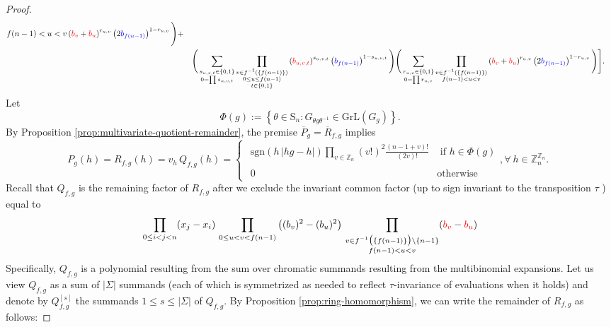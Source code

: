 \begin{proof}
\[\begin{aligned}
{{f(n-1)<u<v
}
}\left({\color{red}b_{v}}+{\color{red}b_{u}}\right)^{r_{u,v}}\left(2{\color{blue}b_{f(n-1)}}\right)^{1-r_{u,v}}\Bigg)+\\
 & \quad\Bigg(\sum_{\substack{s_{u,v,t}\in\{0,1\}\\
0=\prod s_{u,v,t}
}
}\prod_{\substack{v\in f^{-1}(\{f(n-1)\})\\
0\leq u\leq f(n-1)\\
t\in\{0,1\}
}
}\left({\color{red}b_{u,v,t}}\right)^{s_{u,v,t}}\left({\color{blue}b_{f(n-1)}}\right)^{1-s_{u,v,t}}\Bigg)\Bigg(\sum_{\substack{r_{u,v}\in\{0,1\}\\
0=\prod r_{u,v}
}
}\prod_{\substack{v\in f^{-1}(\{f(n-1)\})\\
f(n-1)<u<v
}
}\left({\color{red}b_{v}}+{\color{red}b_{u}}\right)^{r_{u,v}}\left(2{\color{blue}b_{f(n-1)}}\right)^{1-r_{u,v}}\Bigg)\Bigg].
\end{aligned}
\]
Let
\[
\Phi(g):=\left\{ \theta\in\text{S}_{n}:G_{\theta g\theta^{-1}}\in\text{GrL}(G_{g})\right\}.
\]
By Proposition \ref{prop:multivariate-quotient-remainder}, the premise $\overline{P}_{g}=\overline{R}_{f,g}$ implies 
\begin{equation}
P_{g}(h)=R_{f,g}\left(h\right)=v_{h}\,Q_{f,g}\left(h\right)=\begin{cases}
\begin{array}{cc}
\text{sgn}(h\,\left|hg-h\right|)\underset{v\in\mathbb{Z}_{n}}{\prod}\left(v!\right)^{2}\frac{\left(n-1+v\right)!}{\left(2v\right)!} & \text{ if }h\in\Phi(g)\\
\\
0 & \text{otherwise}
\end{array},\forall\:h\in\mathbb{Z}_{n}^{\mathbb{Z}_{n}}.\end{cases}
\end{equation}
Recall that $Q_{f,g}$ is the remaining factor of $R_{f,g}$ after we exclude the invariant common factor (up to sign invariant to the transposition $\tau$ ) equal to
\[
\prod_{0\leq i<j<n}(x_{j}-x_{i})\,\prod_{0\leq u<v<f(n-1)}\big((b_{v})^{2}-(b_{u})^{2}\big)\,\prod_{\substack{v\in f^{-1}\big(\{f(n-1)\}\big)\backslash\{n-1\}\\
f(n-1)<u<v
}
}({\color{red}b_{v}}-{\color{red}b_{u}})
\]
 Specifically, $Q_{f,g}$ is a polynomial resulting from the sum over chromatic summands resulting from the multibinomial expansions.  Let us view $Q_{f,g}$ as a sum of $|\Sigma|$ summands (each of which is symmetrized as needed to reflect $\tau$-invariance of evaluations when it holds) and denote by $Q_{f, g}^{\left[s\right]}$ the summands $1 \leq s \leq |\Sigma|$ of $Q_{f,g}$. By Proposition \ref{prop:ring-homomorphism}, we can write the remainder of $R_{f,g}$ as follows:

\end{proof}
